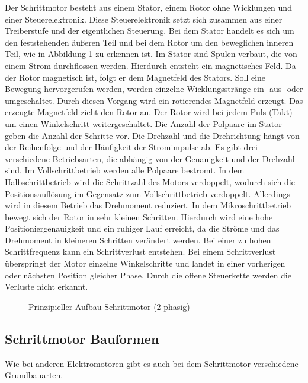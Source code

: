 Der Schrittmotor besteht aus einem Stator, einem Rotor ohne Wicklungen und einer Steuerelektronik. Diese Steuerelektronik setzt sich zusammen aus einer Treiberstufe und der eigentlichen Steuerung. Bei dem Stator handelt es sich um den feststehenden äußeren Teil und bei dem Rotor um den beweglichen inneren Teil, wie in Abbildung \ref{HaPrSchritt} zu erkennen ist. Im Stator sind Spulen verbaut, die von einem Strom durchflossen werden. Hierdurch entsteht ein magnetisches Feld. Da der Rotor magnetisch ist, folgt er dem Magnetfeld des Stators. Soll eine Bewegung hervorgerufen werden, werden einzelne Wicklungsstränge ein- aus- oder umgeschaltet. Durch diesen Vorgang wird ein rotierendes Magnetfeld erzeugt. Das erzeugte Magnetfeld zieht den Rotor an. Der Rotor wird bei jedem Puls (Takt) um einen Winkelschritt weitergeschaltet. Die Anzahl der Polpaare im Stator geben die Anzahl der Schritte vor. Die Drehzahl und die Drehrichtung hängt von der Reihenfolge und der Häufigkeit der Stromimpulse ab. Es gibt drei verschiedene Betriebsarten, die abhängig von der Genauigkeit und der Drehzahl sind. Im Vollschrittbetrieb werden alle Polpaare bestromt. In dem Halbschrittbetrieb wird die Schrittzahl des Motors verdoppelt, wodurch sich die Positionsauflösung im Gegensatz zum Vollschrittbetrieb verdoppelt. Allerdings wird in diesem Betrieb das Drehmoment reduziert. In dem Mikroschrittbetrieb bewegt sich der Rotor in sehr kleinen Schritten. Hierdurch wird eine hohe Positioniergenauigkeit und ein ruhiger Lauf erreicht, da die Ströme und das Drehmoment in kleineren Schritten verändert werden. Bei einer zu hohen Schrittfrequenz kann ein Schrittverlust entstehen. Bei einem Schrittverlust überspringt der Motor einzelne Winkelschritte und landet in einer vorherigen oder nächsten Position gleicher Phase. Durch die offene Steuerkette werden die Verluste nicht erkannt.\cite{Hagl.2021}\cite{Bernstein.2018}\cite{Schroder.2021}

\begin{figure}[H]
	\begin{center}
		\caption{Prinzipieller Aufbau Schrittmotor (2-phasig) \cite{Hagl.2021}} \label{HaPrSchritt}
	\end{center}
\end{figure}

\subsection{Schrittmotor Bauformen}

Wie bei anderen Elektromotoren gibt es auch bei dem Schrittmotor verschiedene Grundbauarten. 

